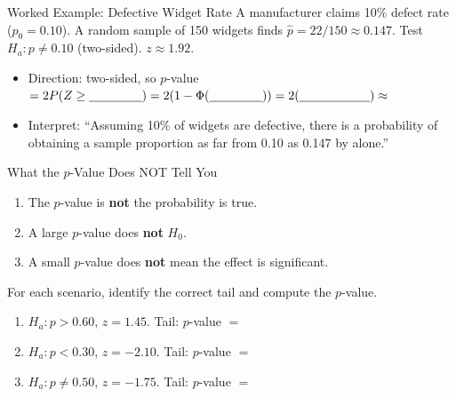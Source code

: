 \documentclass[10pt]{article}
\begin{document}
\begin{notesbox}{Worked Example: Defective Widget Rate}
A manufacturer claims 10\% defect rate ($p_0=0.10$). A random sample of 150 widgets finds
$\hat p = 22/150 \approx 0.147$. Test $H_a: p \ne 0.10$ (two-sided). $z \approx 1.92$.

\begin{itemize}
  \item Direction: two-sided, so $p$-value $= 2P(Z \ge \blank{1.5cm}) = 2(1-\Phi(\blank{1.5cm})) = 2(\blank{2cm}) \approx$ \blank{2cm}
  \item Interpret: ``Assuming 10\% of widgets are defective, there is a \blank{2cm} probability
        of obtaining a sample proportion as far from 0.10 as 0.147 by \blank{3cm} alone.''
\end{itemize}
\end{notesbox}

\begin{notesbox}{What the $p$-Value Does NOT Tell You}
\begin{enumerate}
  \item The $p$-value is \textbf{not} the probability \blank{8cm} is true.
  \item A large $p$-value does \textbf{not} \blank{8cm} $H_0$.
  \item A small $p$-value does \textbf{not} mean the effect is \blank{4cm} significant.
\end{enumerate}
\end{notesbox}

\begin{practicebox}
For each scenario, identify the correct tail and compute the $p$-value.

\begin{enumerate}[label=\alph*.]
  \item $H_a: p > 0.60$, $z = 1.45$. Tail: \blank{2cm} \quad $p$-value $=$ \blank{3cm}
  \item $H_a: p < 0.30$, $z = -2.10$. Tail: \blank{2cm} \quad $p$-value $=$ \blank{3cm}
  \item $H_a: p \ne 0.50$, $z = -1.75$. Tail: \blank{2cm} \quad $p$-value $=$ \blank{3cm}
\end{enumerate}
\end{practicebox}
\end{document}
